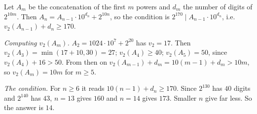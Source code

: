 Let $A_m$ be the concatenation of the first $m$ powers and $d_m$ the number of digits of $2^{10m}$. Then $A_n=A_{n-1}\cdot10^{d_n}+2^{10n}$, so the condition is $2^{170}\mid A_{n-1}\cdot10^{d_n}$, i.e. $v_2(A_{n-1})+d_n\ge170$.

\emph{Computing $v_2(A_m)$.} $A_2=1024\cdot10^7+2^{20}$ has $v_2=17$. Then $v_2(A_3)=\min(17+10,30)=27$; $v_2(A_4)\ge40$; $v_2(A_5)=50$, since $v_2(A_4)+16>50$. From then on $v_2(A_{m-1})+d_m=10(m-1)+d_m>10m$, so $v_2(A_m)=10m$ for $m\ge5$.

\emph{The condition.} For $n\ge6$ it reads $10(n-1)+d_n\ge170$. Since $2^{130}$ has $40$ digits and $2^{140}$ has $43$, $n=13$ gives $160$ and $n=14$ gives $173$. Smaller $n$ give far less. So the answer is $\boxed{14}$.
